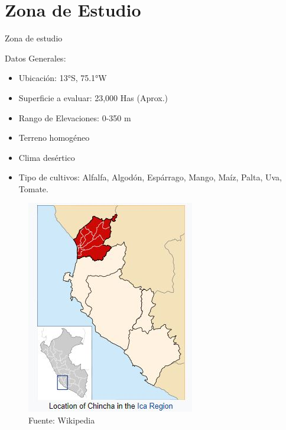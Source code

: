 \section{Zona de Estudio}


\begin{frame}{Zona de estudio}
	\begin{minipage}{0.5\textwidth}
		Datos Generales:
		\begin{itemize}
			\item Ubicación: 13°S, 75.1°W
			\item Superficie a evaluar: 23,000 Has (Aprox.)
			\item Rango de Elevaciones: 0-350 m
			\item Terreno homogéneo
			\item Clima desértico
			\item Tipo de cultivos: Alfalfa, Algodón, Espárrago, Mango, Maíz, Palta, Uva, Tomate.
		\end{itemize}
	\end{minipage} \hfill
	\begin{minipage}{0.45\textwidth}
		\begin{figure}
			\includegraphics[scale=0.5]{imgs/chincha_ubic.JPG}
			\caption{Fuente: Wikipedia}
		\end{figure}
		
	\end{minipage}
\end{frame}


